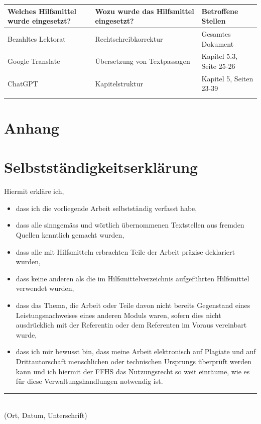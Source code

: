 \documentclass{ffhsthesis}
\begin{document}
\begin{table}[h!]
    \centering
    \begin{tabular}{|p{5cm}|p{5cm}|p{4cm}|} \hline
       \textbf{Welches Hilfsmittel wurde eingesetzt?} & \textbf{Wozu wurde das Hilfsmittel eingesetzt?}  & \textbf{Betroffene Stellen}\\ \hline
        Bezahltes Lektorat & Rechtschreibkorrektur & Gesamtes Dokument \\ \hline
        Google Translate & Übersetzung von Textpassagen & Kapitel 5.3, Seite 25-26 \\ \hline
        ChatGPT & Kapitelstruktur & Kapitel 5, Seiten 23-39 \\ \hline
         &  & \\ \hline
    \end{tabular}
  \label{tab:hilfsmittelverzeichnis}
\end{table}

\newpage
\chapter*{Anhang}

\newpage
\chapter*{Selbstständigkeitserklärung}

Hiermit erkläre ich,
\begin{itemize}
    \item dass ich die vorliegende Arbeit selbstständig verfasst habe,
    \item dass alle sinngemäss und wörtlich übernommenen Textstellen aus fremden Quellen kenntlich gemacht wurden,
    \item dass alle mit Hilfsmitteln erbrachten Teile der Arbeit präzise deklariert wurden,
    \item dass keine anderen als die im Hilfsmittelverzeichnis aufgeführten Hilfsmittel verwendet wurden,
    \item dass das Thema, die Arbeit oder Teile davon nicht bereits Gegenstand eines Leistungsnachweises eines anderen Moduls waren, sofern dies nicht ausdrücklich mit der Referentin oder dem Referenten im Voraus vereinbart wurde,
    \item dass ich mir bewusst bin, dass meine Arbeit elektronisch auf Plagiate und auf Drittautorschaft menschlichen oder technischen Ursprungs überprüft werden kann und ich hiermit der FFHS das Nutzungsrecht so weit einräume, wie es für diese Verwaltungshandlungen notwendig ist.
\end{itemize}

\vspace{4cm}
\noindent
\hrule \ \\[-0.5ex]
(Ort, Datum, Unterschrift)
\clearpage
\newpage
\end{document}
